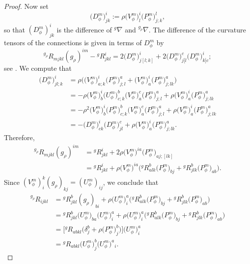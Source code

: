 \documentclass[pdftex]{sigma}
\numberwithin{equation}{section}
\begin{document}
\begin{proof}
Now set
\[
\big(D_\phi^m\big)_{j k}^{i}:=\rho \big(V_\phi^m\big)_{l}^{i} \big(P_\phi^m\big)_{j; k}^{l},
\]
so that $(D_\phi^m)_{j k}^{i}$ is the difference of ${}^{g}\nabla$ and ${}^{g_\rho}\nabla$. The difference of the curvature tensors of the connections is given in terms of $D_\phi^m$ by
\[
{ }^{g_\rho} R_{m j k l} (g_\rho)^{i m}-{ }^{g} R_{j k l}^{i}=2 \big(D_\phi^m\big)_{j[l; k]}^{i}+2 \big(D_\phi^m\big)_{j[l}^{c} \big(D_\phi^m\big)_{k] c}^{i};
\]
see \cite[p.~70]{FeffermanGraham2012}.
We compute that
\begin{align*}
\big(D_\phi^m\big)_{j l; k}^{i} &=\rho\bigl(\big(V_\phi^m\big)_{a; k}^{i} \big(P_\phi^m\big)_{j; l}^{a}+\big(V_\phi^m\big)_{a}^{i} \big(P_\phi^m\big)_{j; l k}^{a}\bigr)
\\[.5mm]
&=-\rho \big(V_\phi^m\big)_{b}^{i} \big(U_\phi^m\big)_{c; k}^{b} \big(V_\phi^m\big)_{a}^{c} \big(P_\phi^m\big)_{j; l}^{a}+\rho \big(V_\phi^m\big)_{a}^{i} \big(P_\phi^m\big)_{j; l k}^{a}
\\[.5mm]
&=-\rho^{2} \big(V_\phi^m\big)_{b}^{i} \big(P_\phi^m\big)_{c; k}^{b} \big(V_\phi^m\big)_{a}^{c} \big(P_\phi^m\big)_{j; l}^{a}+\rho \big(V_\phi^m\big)_{a}^{i} \big(P_\phi^m\big)_{j; l k}^{a}
\\[.5mm]
&=-\big(D_\phi^m\big)_{c k}^{i} \big(D_\phi^m\big)_{j l}^{c}+\rho \big(V_\phi^m\big)_{a}^{i} \big(P_\phi^m\big)_{j; l k}^{a}.
\end{align*}
Therefore,
\begin{align*}
{ }^{g_\rho} R_{m j k l} (g_\rho)^{i m} &={ }^{g} R_{j k l}^{i}+2 \rho \big(V_\phi^m\big)^{i a} \big(P_\phi^m\big)_{a j;[l k]}
\\[.5mm]
&={ }^{g} R_{j k l}^{i}+\rho \big(V_\phi^m\big)^{i a}\bigl({ }^{g} R_{a l k}^{b} \big(P_\phi^m\big)_{b j}+{ }^{g} R_{j l k}^{b} \big(P_\phi^m\big)_{a b}\bigr).
\end{align*}
Since $(V_\phi^m)_{i}^{k} (g_\rho)_{k j}=(U_\phi^m)_{i j}$, we conclude that
\begin{align*}
{ }^{g_\rho} R_{i j k l} &={ }^{g} R_{j k l}^{b} (g_\rho)_{b i}+\rho \big(U_\phi^m\big)_{i}^{a}\bigl({ }^{g} R_{a l k}^{b} \big(P_\phi^m\big)_{b j}+{ }^{g} R_{j l k}^{b} \big(P_\phi^m\big)_{a b}\bigr)
\\[.5mm]
&={ }^{g} R_{j k l}^{b} \big(U_\phi^m\big)_{b a} \big(U_\phi^m\big)_{i}^{a}+\rho \big(U_\phi^m\big)^{a}_{i}\bigl({ }^{g} R_{a l k}^{b} \big(P_\phi^m\big)_{b j}+{ }^{g} R_{j l k}^{b} \big(P_\phi^m\big)_{a b}\bigr)
\\[.5mm]
&=\bigl[{ }^{g} R_{a b k l}\bigl(\delta_{j}^{b}+\rho \big(P_\phi^m\big)_{j}^{b}\bigr)\bigr] \big(U_\phi^m\big)_{i}^{a} \\[.5mm]
&={ }^{g} R_{a b k l} \big(U_\phi^m\big)_{j}^{b} \big(U_\phi^m\big)^{a}{ }_{i}.\tag*{\qed}
\end{align*}
\renewcommand{\qed}{}
\end{proof}
\end{document}
